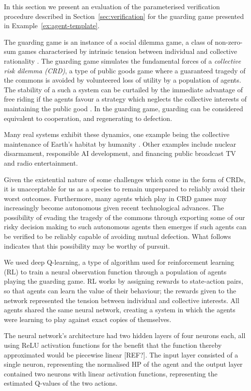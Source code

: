 
In this section we present an evaluation of the parameterised verification
procedure described in Section~\ref{sec:verification} for the guarding game
presented in Example~\ref{ex:agent-template}.


The guarding game is an instance of a social dilemma game, a class of
non-zero-sum games characterised by intrinsic tension between individual and
collective rationality \cite{VanlangeJPV13}. The guarding game simulates the
fundamental forces of a \emph{collective risk dilemma (CRD)}, a type of public
goods game where a guaranteed tragedy of the commons \cite{Hardin68} is avoided
by volunteered loss of utility by a population of agents. The stability of a
such a system can be curtailed by the immediate advantage of free riding if the
agents favour a strategy which neglects the collective interests of maintaining
the public good \cite{SantosP11}. In the guarding game, guarding can be
considered equivalent to cooperation, and regenerating to
defection.

Many real systems exhibit these dynamics, one example being the collective
maintenance of Earth's habitat by humanity \cite{Smirnov19}. Other examples
include nuclear disarmament, responsible AI development, and financing public
broadcast TV and radio entertainment.

Given the existential nature of some challenges which come in the form of CRDs,
it is unacceptable for us as a species to remain unprepared to reliably avoid
their worst outcomes. Furthermore, many agents which play in CRD games may
increasingly become autonomous given recent technological advances. The
possibility of evading the tragedy of the commons through exporting some of our
risky decision making to such autonomous agents then emerges if such agents can
be verified to be reliably capable of avoiding mutual defection. What follows
indicates that this possibility may be worthy of pursuit.

We used deep Q-learning, a type of algorithm used for reinforcement learning (RL) to train a neural observation function through a population of agents playing the guarding game. RL works by assigning rewards to state-action pairs, so that agents can learn the value of their behaviour; the rewards given to the network represented the tension between individual and collective interests. All agents shared the same neural network, creating a system in which the agents were learning to play against exact copies of themselves. 

The neural network's architecture had two hidden layers of four neurons each, all using ReLU activation functions for the benefit that the function thereby approximated would be piecewise linear [REF?]. The input layer consisted of a single neuron, representing the normalised HP of the agent and the output layer contained two neurons with linear activation functions, representing the estimated Q-values of the two actions. 

